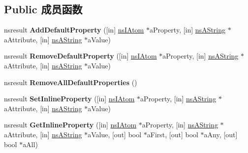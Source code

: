 \subsection*{Public 成员函数}
\begin{DoxyCompactItemize}
\item 
\mbox{\label{interfacens_i_h_t_m_l_editor_a68d02e223d0aacf2bfd3699dc2ad2f14}} 
nsresult {\bfseries Add\+Default\+Property} (\mbox{[}in\mbox{]} \hyperlink{interfacens_i_supports}{ns\+I\+Atom} $\ast$a\+Property, \mbox{[}in\mbox{]} \hyperlink{structns_string_container}{ns\+A\+String} $\ast$a\+Attribute, \mbox{[}in\mbox{]} \hyperlink{structns_string_container}{ns\+A\+String} $\ast$a\+Value)
\item 
\mbox{\label{interfacens_i_h_t_m_l_editor_a4688ed6974b7d6ed5d9b2a6d50e697de}} 
nsresult {\bfseries Remove\+Default\+Property} (\mbox{[}in\mbox{]} \hyperlink{interfacens_i_supports}{ns\+I\+Atom} $\ast$a\+Property, \mbox{[}in\mbox{]} \hyperlink{structns_string_container}{ns\+A\+String} $\ast$a\+Attribute, \mbox{[}in\mbox{]} \hyperlink{structns_string_container}{ns\+A\+String} $\ast$a\+Value)
\item 
\mbox{\label{interfacens_i_h_t_m_l_editor_a7c5052dc04c589d79f5fb826f018c864}} 
nsresult {\bfseries Remove\+All\+Default\+Properties} ()
\item 
\mbox{\label{interfacens_i_h_t_m_l_editor_aa92d437e03d0b9bce81043abc4fb794d}} 
nsresult {\bfseries Set\+Inline\+Property} (\mbox{[}in\mbox{]} \hyperlink{interfacens_i_supports}{ns\+I\+Atom} $\ast$a\+Property, \mbox{[}in\mbox{]} \hyperlink{structns_string_container}{ns\+A\+String} $\ast$a\+Attribute, \mbox{[}in\mbox{]} \hyperlink{structns_string_container}{ns\+A\+String} $\ast$a\+Value)
\item 
\mbox{\label{interfacens_i_h_t_m_l_editor_aa37d67a43bb7844a01353546b9ff4365}} 
nsresult {\bfseries Get\+Inline\+Property} (\mbox{[}in\mbox{]} \hyperlink{interfacens_i_supports}{ns\+I\+Atom} $\ast$a\+Property, \mbox{[}in\mbox{]} \hyperlink{structns_string_container}{ns\+A\+String} $\ast$a\+Attribute, \mbox{[}in\mbox{]} \hyperlink{structns_string_container}{ns\+A\+String} $\ast$a\+Value, \mbox{[}out\mbox{]} bool $\ast$a\+First, \mbox{[}out\mbox{]} bool $\ast$a\+Any, \mbox{[}out\mbox{]} bool $\ast$a\+All)

\end{DoxyCompactItemize}
